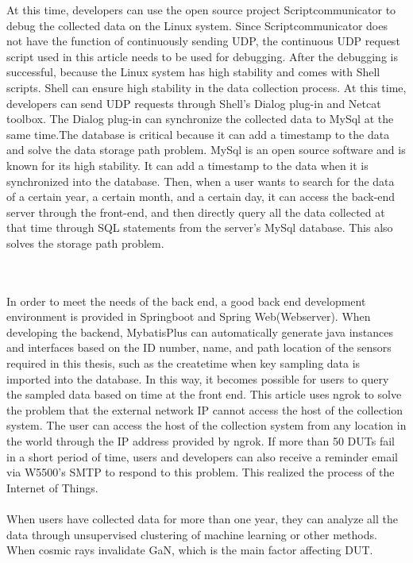 At this time, developers can use the open source project Scriptcommunicator to debug the collected data on the Linux system. Since Scriptcommunicator does not have the function of continuously sending UDP, the continuous UDP request script used in this article needs to be used for debugging. After the debugging is successful, because the Linux system has high stability and comes with Shell scripts. Shell can ensure high stability in the data collection process. At this time, developers can send UDP requests through Shell's Dialog plug-in and Netcat toolbox. The Dialog plug-in can synchronize the collected data to MySql at the same time.The database is critical because it can add a timestamp to the data and solve the data storage path problem. MySql is an open source software and is known for its high stability. It can add a timestamp to the data when it is synchronized into the database. Then, when a user wants to search for the data of a certain year, a certain month, and a certain day, it can access the back-end server through the front-end, and then directly query all the data collected at that time through SQL statements from the server's MySql database. This also solves the storage path problem.

\\
\\
In order to meet the needs of the back end, a good back end development environment is provided in Springboot and Spring Web(Webserver). When developing the backend, MybatisPlus can automatically generate java instances and interfaces based on the ID number, name, and path location of the sensors required in this thesis, such as the createtime when key sampling data is imported into the database. In this way, it becomes possible for users to query the sampled data based on time at the front end. This article uses ngrok to solve the problem that the external network IP cannot access the host of the collection system. The user can access the host of the collection system from any location in the world through the IP address provided by ngrok. If more than 50 DUTs fail in a short period of time, users and developers can also receive a reminder email via W5500's SMTP to respond to this problem. This realized the process of the Internet of Things.
\\

\\
When users have collected data for more than one year, they can analyze all the data through unsupervised clustering of machine learning or other methods. When cosmic rays invalidate GaN, which is the main factor affecting DUT.







